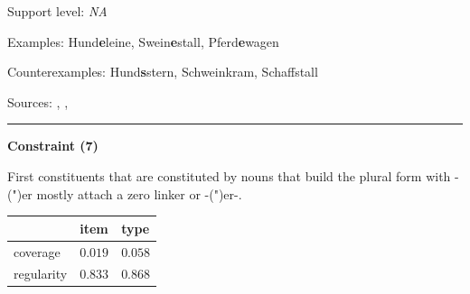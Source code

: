 \vspace{-1.35em}

\noindent
Support level: \textit{NA}

\vspace{0.3em}

\noindent
Examples: Hund\textbf{e}leine, Swein\textbf{e}stall, Pferd\textbf{e}wagen

\noindent
Counterexamples: Hund\textbf{s}stern, Schwein{\zeroLinker}kram, Schaff{\zeroLinker}stall

\vspace{0.3em}

\noindent
Sources: \citet[228]{eisenberg_2013}, \citet[11]{nuebling_szczepaniak_2008}, \citet[81]{nuebling_szczepaniak_2013}

\vspace{0.35em}
\hrule




\vspace{0.4em}

\begin{center}
\textbf{Constraint (7)}
\end{center}

\noindent
First constituents that are constituted by nouns that build the plural form with -(")er mostly attach a zero linker or -(")er-.
\vspace{0.5em}


\vspace{-0.25em}

\begin{table}[!ht]
\begin{center}
\setlength{\extrarowheight}{1pt}
\begin{tabularx}{\columnwidth}{|X|X|X|}
\hline
 & item & type \\
\hline
 coverage & $0.019$ & $0.058$ \\
\hline
 regularity & $0.833$ & $0.868$ \\
\hline
\end{tabularx}
\end{center}
\end{table}

